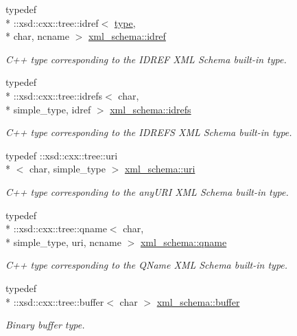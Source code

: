 \begin{DoxyCompactItemize}
typedef \\*
\-::xsd\-::cxx\-::tree\-::idref$<$ \hyperlink{classtype}{type}, \\*
char, ncname $>$ \hyperlink{namespacexml__schema_ac4af625f2450257be84f5475dbfe8fdd}{xml\-\_\-schema\-::idref}
\begin{DoxyCompactList}\small\item\em C++ type corresponding to the I\-D\-R\-E\-F X\-M\-L Schema built-\/in type. \end{DoxyCompactList}\item 
typedef \\*
\-::xsd\-::cxx\-::tree\-::idrefs$<$ char, \\*
simple\-\_\-type, idref $>$ \hyperlink{namespacexml__schema_adb5f7e4c5a09caf31f94ace50b148674}{xml\-\_\-schema\-::idrefs}
\begin{DoxyCompactList}\small\item\em C++ type corresponding to the I\-D\-R\-E\-F\-S X\-M\-L Schema built-\/in type. \end{DoxyCompactList}\item 
typedef \-::xsd\-::cxx\-::tree\-::uri\\*
$<$ char, simple\-\_\-type $>$ \hyperlink{namespacexml__schema_a2518fddf119bd258d7443408863ee457}{xml\-\_\-schema\-::uri}
\begin{DoxyCompactList}\small\item\em C++ type corresponding to the any\-U\-R\-I X\-M\-L Schema built-\/in type. \end{DoxyCompactList}\item 
typedef \\*
\-::xsd\-::cxx\-::tree\-::qname$<$ char, \\*
simple\-\_\-type, uri, ncname $>$ \hyperlink{namespacexml__schema_af47d5d85d1b1714be503513b1c09c079}{xml\-\_\-schema\-::qname}
\begin{DoxyCompactList}\small\item\em C++ type corresponding to the Q\-Name X\-M\-L Schema built-\/in type. \end{DoxyCompactList}\item 
typedef \\*
\-::xsd\-::cxx\-::tree\-::buffer$<$ char $>$ \hyperlink{namespacexml__schema_aff62181c1704f35372302e2acde9b0cc}{xml\-\_\-schema\-::buffer}
\begin{DoxyCompactList}\small\item\em Binary buffer type. \end{DoxyCompactList}\item 

\end{DoxyCompactItemize}

